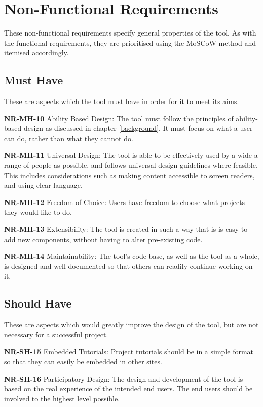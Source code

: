 \documentclass{l4proj}
\begin{document}
\section{Non-Functional Requirements}
These non-functional requirements specify general properties of the tool. As with the functional requirements, they are prioritised using the MoSCoW method and itemised accordingly.  

\subsection{Must Have}
These are aspects which the tool must have in order for it to meet its aims. 

\textbf{NR-MH-10} Ability Based Design: The tool must follow the principles of ability-based design as discussed in chapter \ref{background}. It must focus on what a user can do, rather than what they cannot do.

\textbf{NR-MH-11} Universal Design: The tool is able to be effectively used by a wide a range of people as possible, and follows universal design guidelines where feasible. This includes considerations such as making content accessible to screen readers, and using clear language.

\textbf{NR-MH-12} Freedom of Choice: Users have freedom to choose what projects they would like to do. 

\textbf{NR-MH-13} Extensibility: The tool is created in such a way that is is easy to add new components, without having to alter pre-existing code. 

\textbf{NR-MH-14} Maintainability: The tool's code base, as well as the tool as a whole, is designed and well documented so that others can readily continue working on it. 

\subsection{Should Have}
These are aspects which would greatly improve the design of the tool, but are not necessary for a successful project. 

\textbf{NR-SH-15} Embedded Tutorials: Project tutorials should be in a simple format so that they can easily be embedded in other sites.

\textbf{NR-SH-16} Participatory Design: The design and development of the tool is based on the real experience of the intended end users. The end users should be involved to the highest level possible. 
\end{document}
